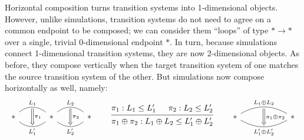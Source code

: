\documentclass[acmsmall,screen,review,anonymous]{acmart}
\newcommand{\kw}[1]{\ensuremath{ \mathsf{#1} }}
\begin{document}
Horizontal composition turns transition systems into 1-dimensional objects.
However, unlike simulations,
transition systems %
do not need to agree on a common endpoint to be composed;
we can consider them ``loops'' of type ${*} \rightarrow {*}$
over a single, trivial 0-dimensional endpoint $*$.
%
In turn, because simulations connect 1-dimensional transition systems,
they are now 2-dimensional objects.
As before,
they compose vertically when the target transition system of one
matches the source transition system of the other.
But simulations now compose horizontally as well,
namely:
\[
  \begin{tikzcd}[row sep=tiny, column sep=small]
    & {} \ar[dd, Rightarrow, "\pi_1"] & & {} \ar[dd, Rightarrow, "\pi_2"] \\
    {*} \ar[rr, bend left=40, "L_1", dash]
            \ar[rr, bend right=40, "L_1'"', dash] & &
    {*} \ar[rr, bend left=40, "L_2", dash]
            \ar[rr, bend right=40, "L_2'"', dash] & &
    {*} \\
    & {} & & {}
  \end{tikzcd}
  \qquad
  \begin{prooftree}
     \hypo{\pi_1 : L_1 \le L_1'}
     \hypo{\pi_2 : L_2 \le L_2'}
     \infer2{\pi_1 \oplus \pi_2 : L_1 \oplus L_2 \le L_1' \oplus L_2'}
  \end{prooftree}
  \qquad
  \begin{tikzcd}[row sep=tiny]
    & {} \ar[dd, Rightarrow, "\pi_1 \oplus \pi_2"] & \\
    {*}
      \ar[rr, bend left, "L_1 \oplus L_2", dash]
      \ar[rr, bend right, "L_1' \oplus L_2'"', dash] & &
    {*}
    \\
    & {} &
  \end{tikzcd}
\]
%
\end{document}
